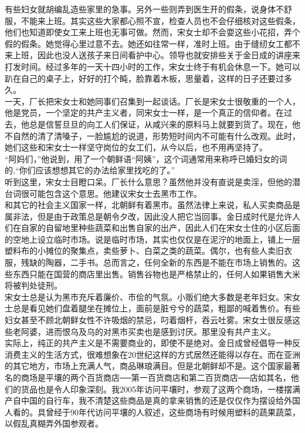 有些妇女就胡编乱造些家里的急事。另外一些则弄到医生开的假条，说身体不舒服，不能来上班。其实这些大家都心照不宣，检查人员也不会仔细核对这些假条，他们也知道即使女工来上班也无事可做。然而，宋女士却不会耍这些小花招，弄个假的假条。她觉得心里过意不去。她还如往常一样，准时上班。由于缝纫女工都不来上班，因此也没人送孩子来日间看护中心。领导也就安排些关于金日成的讲座来打发时间。经过多年的一天十四小时的工作，宋女士终于有机会休息一下。她可以趴在自己的桌子上，好好的打个盹，脸靠着木板，思量着，这样的日子还要过多久。\\

一天，厂长把宋女士和她同事们召集到一起谈话。厂长是宋女士很敬重的一个人，他是党员，一个坚定的共产主义者，同宋女士一样，是一个真正的信仰者。在过去，他总是信誓旦旦的向工人们保证，从咸兴来的原料马上就要到货了。现在，他不自然的清了清嗓子，一脸尴尬的说道，形势短时间内不可能有什么改观。此时，她们这些和宋女士一样坚守岗位的女工们，从今以后，也不用再坚持了。\\

“阿妈们，”他说到，用了一个朝鲜语“阿姨”，这个词通常用来称呼已婚妇女的词的,“你们应该想想其它的办法给家里找吃的了。”\\

听到这里，宋女士目瞪口呆。厂长什么意思？虽然他并没有直说是卖淫，但他的潜台词很可能包含这个意思。他建议宋女士去黑市工作。\\

和其它的社会主义国家一样，北朝鲜有着黑市。虽然法律上来说，私人买卖商品是属非法，但是由于政策总是朝令夕改，因此没人把它当回事。金日成时代是允许人们在自家的自留地里种些蔬菜和出售自家的出产，因此人们在宋女士住的小区后面的空地上设立临时市场。说是临时市场，其实也仅仅是在泥泞的地面上，铺上一层塑料布的小摊位的聚集点，卖些萝卜、白菜之类的蔬菜。偶尔，也有些人卖旧衣服，残缺的陶器，二手书。总而言之，任何全新的东西是不能在市场上销售的。这些东西只能在国营的商店里出售。销售谷物也是严格禁止的，任何人如果销售大米将被判处徒刑。\\

宋女士总是认为黑市充斥着廉价、市侩的气氛。小贩们绝大多数是老年妇女。宋女士总是看见她们盘着腿坐在摊位上，面前是脏兮兮的蔬菜，粗鄙的喊着售价。有些妇女甚至不顾北朝鲜女性不许吸烟的禁忌，叼着烟杆，吞云吐雾。宋女士很反感这些老阿婆，进而恨乌及乌的对黑市买卖也是感到讨厌。那里没有共产主义。\\

实际上，纯正的共产主义是不需要商业的，即使不是绝对。金日成曾经倡导一种反消费主义的生活方式，很难想象在20世纪这样的方式居然还能得以存在。而在亚洲的其它地方，市场上充满人气，商品琳琅满目。但是北朝鲜却不是。这个国家最著名的商场是平壤的两个百货商店──第一百货商店和第二百货商店──店如其名，他们的货品也是令人印象深刻。我2005年访问平壤时，参观了这两个商场，一楼摆满产自中国的自行车，我不清楚这些商品是真的拿来销售的还是仅仅作为摆设给外国人看的。具曾经于90年代访问平壤的人叙述，这些商场有时候用塑料的蔬果蔬菜，以假乱真糊弄外国参观者。\\

